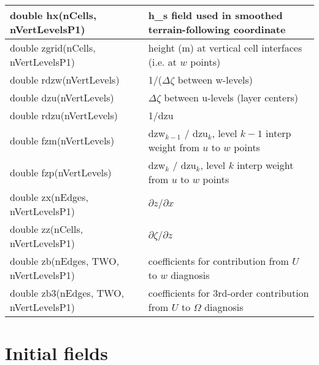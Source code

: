 {\small        
\begin{longtable}{|p{2.5in} |p{3.75in}|}
 \hline
        double hx(nCells, nVertLevelsP1)     & h\_s field used in smoothed terrain-following coordinate \\ \hline
        double zgrid(nCells, nVertLevelsP1)  & height (m) at vertical cell interfaces (i.e. at $w$ points) \\ \hline
        double rdzw(nVertLevels)                & 1/($\Delta \zeta$ between w-levels) \\ \hline
        double dzu(nVertLevels)                 & $\Delta \zeta$ between u-levels (layer centers) \\ \hline
        double rdzu(nVertLevels)                & 1/dzu \\ \hline
        double fzm(nVertLevels)                 & dzw$_{k-1}$ / dzu$_k$, level $k-1$ interp weight from \hfil \break $u$ to $w$ points \\ \hline
        double fzp(nVertLevels)                 & dzw$_k$ / dzu$_k$, level $k$ interp weight from $u$ to $w$ points \\ \hline
        double zx(nEdges, nVertLevelsP1)        & $\partial z / \partial x$ \\ \hline
        double zz(nCells, nVertLevelsP1)        & $\partial \zeta / \partial z$ \\ \hline
        double \hfil\break zb(nEdges, TWO, nVertLevelsP1)   & coefficients for contribution from $U$ to $w$ diagnosis \\ \hline
        double \hfil\break zb3(nEdges, TWO, nVertLevelsP1)  & coefficients for 3rd-order contribution from $U$ to $\Omega$ \hfil\break diagnosis \\ \hline
\end{longtable}
}
   
\newpage        
\section{Initial fields}  


